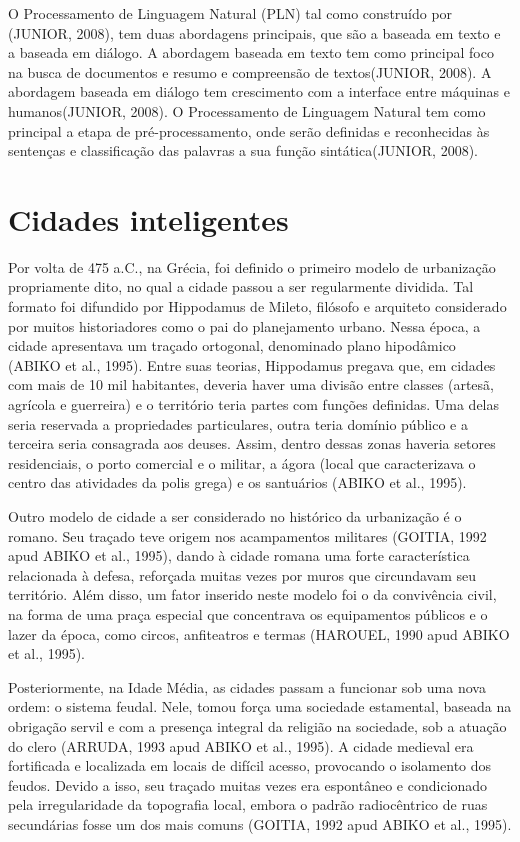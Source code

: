 O Processamento de Linguagem Natural (PLN) tal como construído por (JUNIOR, 2008), tem duas abordagens principais, que são a baseada em texto e a baseada em diálogo. A abordagem baseada em texto tem como principal foco na busca de documentos e resumo e compreensão de textos(JUNIOR, 2008). A abordagem baseada em diálogo tem crescimento com a interface entre máquinas e humanos(JUNIOR, 2008). 
O Processamento de Linguagem Natural tem como principal a etapa de pré-processamento, onde serão definidas e reconhecidas às sentenças e classificação das palavras a sua função sintática(JUNIOR, 2008).

\section{Cidades inteligentes} \label{s:cidades_inteligentes}

Por volta de 475 a.C., na Grécia, foi definido o primeiro modelo de urbanização propriamente dito, no qual a cidade passou a ser regularmente dividida. Tal formato foi difundido por Hippodamus de Mileto, filósofo e arquiteto considerado por muitos historiadores como o pai do planejamento urbano. Nessa época, a cidade apresentava um traçado ortogonal, denominado plano hipodâmico (ABIKO et al., 1995). Entre suas teorias, Hippodamus pregava que, em cidades com mais de 10 mil habitantes, deveria haver uma divisão entre classes (artesã, agrícola e guerreira) e o território teria partes com funções definidas. Uma delas seria reservada a propriedades particulares, outra teria domínio público e a terceira seria consagrada aos deuses. Assim, dentro dessas zonas haveria setores residenciais, o porto comercial e o militar, a ágora (local que caracterizava o centro das atividades da polis grega) e os santuários (ABIKO et al., 1995).

Outro modelo de cidade a ser considerado no histórico da urbanização é o romano. Seu traçado teve origem nos acampamentos militares (GOITIA, 1992 apud ABIKO et al., 1995), dando à cidade romana uma forte característica relacionada à defesa, reforçada muitas vezes por muros que circundavam seu território. Além disso, um fator inserido neste modelo foi o da convivência civil, na forma de uma praça especial que concentrava os equipamentos públicos e o lazer da época, como circos, anfiteatros e termas (HAROUEL, 1990 apud ABIKO et al., 1995).

Posteriormente, na Idade Média, as cidades passam a funcionar sob uma nova ordem: o sistema feudal. Nele, tomou força uma sociedade estamental, baseada na obrigação servil e com a presença integral da religião na sociedade, sob a atuação do clero (ARRUDA, 1993 apud ABIKO et al., 1995). A cidade medieval era fortificada e localizada em locais de difícil acesso, provocando o isolamento dos feudos. Devido a
isso, seu traçado muitas vezes era espontâneo e condicionado pela irregularidade da topografia local, embora o padrão radiocêntrico de ruas secundárias fosse um dos mais comuns (GOITIA, 1992 apud ABIKO et al., 1995).

